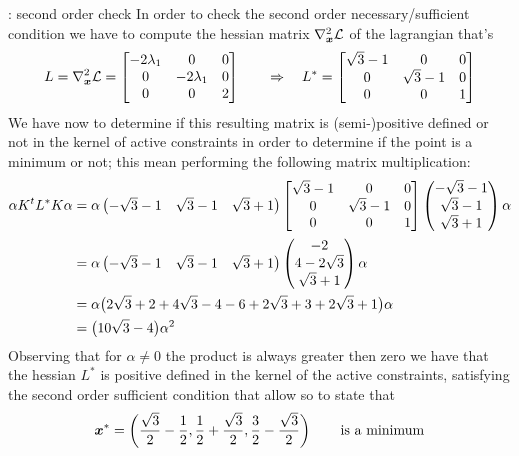 \begin{example}{: second order check}
		In order to check the second order necessary/sufficient condition we have to compute the hessian matrix $\nabla^2_{\boldsymbol{x}} \mathcal L$ of the lagrangian that's
		\[ L = \nabla^2_{\boldsymbol{x}} \mathcal L = \begin{bmatrix}
			-2 \lambda_1 & 0 & 0 \\ 
			0 & -2 \lambda_1 & 0 \\
			0 & 0 & 2
		\end{bmatrix} \qquad \Rightarrow \quad L^* = \begin{bmatrix}
			\sqrt 3 - 1 & 0 & 0 \\ 0 & \sqrt 3 - 1 & 0 \\ 0 & 0 & 1
		\end{bmatrix} \]
		We have now to determine if this resulting matrix is (semi-)positive defined or not in the kernel of active constraints in order to determine if the point is a minimum or not; this mean performing the following matrix multiplication:
		\begin{align*}
			\alpha K^t L^* K \alpha & = \alpha \begin{pmatrix} -\sqrt 3 - 1 & \sqrt 3 - 1 & \sqrt 3 + 1 \end{pmatrix} \begin{bmatrix}
				\sqrt 3 - 1 & 0 & 0 \\ 0 & \sqrt 3 - 1 & 0 \\ 0 & 0 & 1
			\end{bmatrix} \begin{pmatrix} -\sqrt 3 - 1 \\ \sqrt 3 - 1 \\ \sqrt 3 + 1 \end{pmatrix} \alpha \\
			& = \alpha \begin{pmatrix} -\sqrt 3 - 1 & \sqrt 3 - 1 & \sqrt 3 + 1 \end{pmatrix}  \begin{pmatrix} -2 \\ 4 -2\sqrt 3 \\ \sqrt 3 + 1 \end{pmatrix} \alpha \\
			& = \alpha \big( 2\sqrt 3 +2 + 4\sqrt 3 - 4 -6 + 2\sqrt 3 + 3 + 2\sqrt 3 +1 \big) \alpha \\
			& = \big(10 \sqrt 3 - 4\big)\alpha^2 
		\end{align*}
		Observing that for $\alpha \neq 0$ the product is always greater then zero we have that the hessian $L^*$ is positive defined in the kernel of the active constraints, satisfying the second order sufficient condition that allow so to state that
		\[ \boldsymbol{x}^* = \left( \frac{\sqrt 3}{2} - \frac 12, \frac 1 2 + \frac{\sqrt 3}{2}, \frac 3 2 - \frac{\sqrt 3}{2} \right) \qquad \textrm{is a minimum} \]
	
	\end{example}
	
